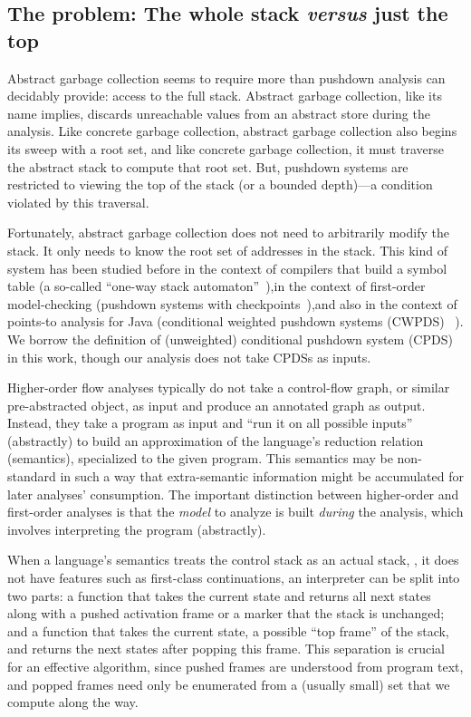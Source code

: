\subsection{The problem: The whole stack \emph{versus} just the top}


Abstract garbage collection seems to require more than pushdown analysis can
decidably provide: access to the full stack.
Abstract garbage collection, like its name implies, discards unreachable values
from an abstract store during the analysis.
Like concrete garbage collection, abstract garbage collection also begins its
sweep with a root set, and like concrete garbage collection, it must traverse
the abstract stack to compute that root set.
But, pushdown systems are restricted to viewing the top of the stack (or
a bounded depth)---a condition violated by this traversal.

Fortunately, abstract garbage collection does not need to arbitrarily modify
the stack.
It only needs to know the root set of addresses in the stack.
This kind of system has been studied before in the context of compilers that build a symbol table (a so-called ``one-way stack automaton''~\citep{ianjohnson:one-way-sa:ginsburg:1967}),in the context of first-order model-checking (pushdown systems with checkpoints~\citep{EsparzaKS03}),and also in the context of points-to analysis for Java (conditional weighted pushdown systems (CWPDS) ~\citep{ianjohnson:DBLP:conf/pepm/LiO10}).
We borrow the definition of (unweighted) conditional pushdown system (CPDS) in this work, though our analysis does not take CPDSs as inputs.


Higher-order flow analyses typically do not take a control-flow graph, or similar pre-abstracted object, as input and produce an annotated graph as output.
Instead, they take a program as input and ``run it on all possible inputs'' (abstractly) to build an approximation of the language's reduction relation (semantics), specialized to the given program.
This semantics may be non-standard in such a way that extra-semantic information might be accumulated for later analyses' consumption.
The important distinction between higher-order and first-order analyses is that the \emph{model} to analyze is built \emph{during} the analysis, which involves interpreting the program (abstractly).


When a language's semantics treats the control stack as an actual stack, \ie, it does not have features such as first-class continuations, an interpreter can be split into two parts:
 a function that takes the current state and returns all next states along with a pushed activation frame or a marker that the stack is unchanged;
 and a function that takes the current state, a possible ``top frame'' of the stack, and returns the next states after popping this frame.
This separation is crucial for an effective algorithm, since pushed frames are understood from program text, and popped frames need only be enumerated from a (usually small) set that we compute along the way.



